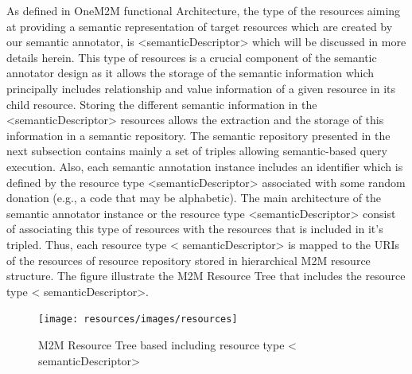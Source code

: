 As defined in OneM2M functional Architecture, the type of the resources aiming at providing a semantic representation of target resources which are created by our semantic annotator, is <semanticDescriptor> which will be discussed in more details herein. This type of resources is a crucial component of the semantic annotator design as it allows the storage of the semantic information which principally includes relationship and value information of a given resource in its child resource. Storing the different semantic information in the <semanticDescriptor> resources allows the extraction and the storage of this information in a semantic repository. The semantic repository presented in the next subsection contains mainly a set of triples allowing semantic-based query execution. Also, each semantic annotation instance includes an identifier which is defined by the resource type <semanticDescriptor> associated with some random donation (e.g., a code that may be alphabetic). The main architecture of the semantic annotator instance or the resource type <semanticDescriptor> consist of associating this type of resources with the resources that is included in it's tripled. Thus, each resource type < semanticDescriptor> is mapped to the URIs of the resources of resource repository stored in hierarchical M2M resource structure.  The figure illustrate the M2M Resource Tree that includes the resource type < semanticDescriptor>.\par
\begin{figure}[htbp]
    \centering
    \texttt{[image: resources/images/resources]}
    \caption{M2M Resource Tree based including resource type < semanticDescriptor> }\label{fig:contrib1:goal}
\end{figure}

